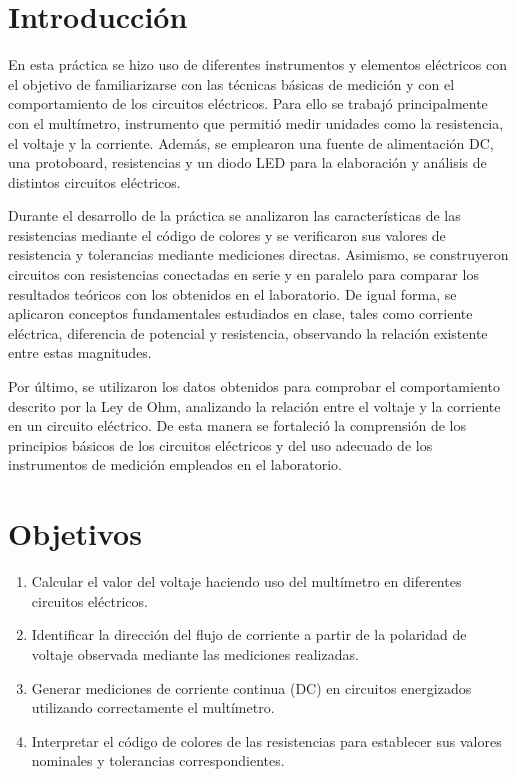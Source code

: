 \documentclass{article}
\begin{document}
    \section{Introducción}

    En esta práctica se hizo uso de diferentes instrumentos y elementos eléctricos con el objetivo de familiarizarse con las técnicas básicas de medición y con el comportamiento de los circuitos eléctricos. 
    Para ello se trabajó principalmente con el multímetro, instrumento que permitió medir unidades como la resistencia, el voltaje y la corriente. 
    Además, se emplearon una fuente de alimentación DC, una protoboard, resistencias y un diodo LED para la elaboración y análisis de distintos circuitos eléctricos.

    Durante el desarrollo de la práctica se analizaron las características de las resistencias mediante el código de colores y se verificaron sus valores de resistencia y tolerancias mediante mediciones directas.
    Asimismo, se construyeron circuitos con resistencias conectadas en serie y en paralelo para comparar los resultados teóricos con los obtenidos en el laboratorio.
    De igual forma, se aplicaron conceptos fundamentales estudiados en clase, tales como corriente eléctrica, diferencia de potencial y resistencia, observando la relación existente entre estas magnitudes.

    Por último, se utilizaron los datos obtenidos para comprobar el comportamiento descrito por la Ley de Ohm, analizando la relación entre el voltaje y la corriente en un circuito eléctrico. De esta manera se fortaleció la comprensión de los principios básicos de los circuitos eléctricos y del uso adecuado de los instrumentos de medición empleados en el laboratorio.



    \section{Objetivos}

    \begin{enumerate}
        \item Calcular el valor del voltaje haciendo uso del multímetro en diferentes circuitos eléctricos.
        \item Identificar la dirección del flujo de corriente a partir de la polaridad de voltaje observada mediante las mediciones realizadas.
        \item Generar mediciones de corriente continua (DC) en circuitos energizados utilizando correctamente el multímetro.
        \item Interpretar el código de colores de las resistencias para establecer sus valores nominales y tolerancias correspondientes.
    \end{enumerate}
\end{document}
